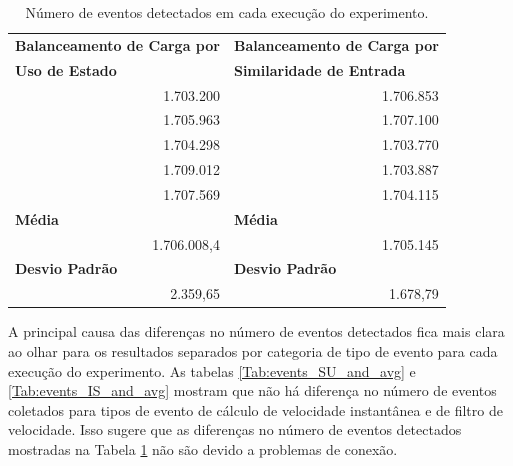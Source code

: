 \begin{table}[h!]
\centering
\caption{Número de eventos detectados em cada execução do experimento.}
\begin{tabular}{rr}
\multicolumn{1}{l}{\textbf{Balanceamento de Carga por}} & \multicolumn{1}{l}{\textbf{Balanceamento de Carga por}}  \\
\multicolumn{1}{l}{\textbf{Uso de Estado}} & \multicolumn{1}{l}{\textbf{Similaridade de Entrada}}  \\
     1.703.200   &    1.706.853     \\
           1.705.963    & 1.707.100 \\
       1.704.298    &   1.703.770   \\
        1.709.012    &  1.703.887  \\
            1.707.569  &  1.704.115 \\
\multicolumn{1}{l}{\textbf{Média}}& \multicolumn{1}{l}{\textbf{Média}}\\
       1.706.008,4   &  1.705.145  \\
\multicolumn{1}{l}{\textbf{Desvio Padrão}}& \multicolumn{1}{l}{\textbf{Desvio Padrão}} \\
 2.359,65   &  1.678,79 
\end{tabular}
\label{Tab:events_total_and_avg}
\end{table}

A principal causa das diferenças no número de eventos detectados fica mais clara ao olhar para os resultados separados por categoria de tipo de evento para cada execução do experimento. As tabelas \ref{Tab:events_SU_and_avg} e \ref{Tab:events_IS_and_avg} mostram que não há diferença no número de eventos coletados para tipos de evento de cálculo de velocidade instantânea e de filtro de velocidade. Isso sugere que as diferenças no número de eventos detectados mostradas na Tabela \ref{Tab:events_total_and_avg} não são devido a problemas de conexão. 

